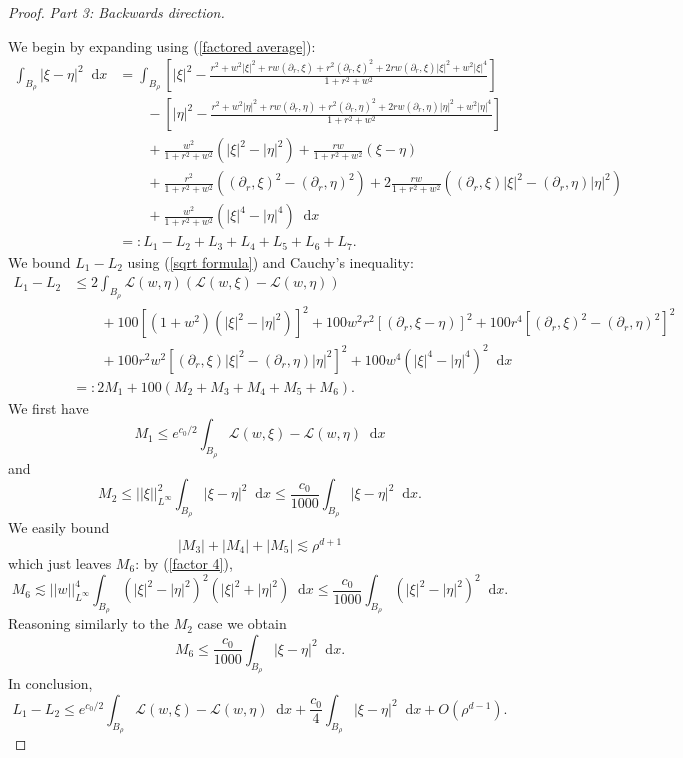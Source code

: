 \documentclass[reqno,10pt]{amsart}
\newcommand*\dif{\mathop{}\!\mathrm{d}}
\newcommand{\Lagrange}{\mathscr L}
\theoremstyle{definition}
\newcommand{\proofpart}[2]{%
  \par
  \addvspace{\medskipamount}%
  \noindent\emph{Part #1: #2.}
}
\numberwithin{equation}{section}
\begin{document}
\begin{proof}
\proofpart{3}{Backwards direction}
We begin by expanding using (\ref{factored average}):
\begin{align*}
\int_{B_\rho} |\xi - \eta|^2 \dif x &= \int_{B_\rho} \left[|\xi|^2 - \frac{r^2 + w^2 |\xi|^2 + rw (\partial_r, \xi) + r^2 (\partial_r, \xi)^2 + 2 rw (\partial_r, \xi) |\xi|^2 + w^2 |\xi|^4}{1 + r^2 + w^2}\right] \\
&\qquad - \left[|\eta|^2 - \frac{r^2 + w^2 |\eta|^2 + rw (\partial_r, \eta) + r^2 (\partial_r, \eta)^2 + 2 rw (\partial_r, \eta) |\eta|^2 + w^2 |\eta|^4}{1 + r^2 + w^2}\right] \\
&\qquad + \frac{w^2}{1 + r^2 + w^2} (|\xi|^2 - |\eta|^2) + \frac{rw}{1 + r^2 + w^2}(\xi - \eta) \\
&\qquad + \frac{r^2}{1 + r^2 + w^2} ((\partial_r, \xi)^2 - (\partial_r, \eta)^2) + 2\frac{rw}{1 + r^2 + w^2} ((\partial_r, \xi)|\xi|^2 - (\partial_r, \eta)|\eta|^2) \\
&\qquad + \frac{w^2}{1 + r^2 + w^2}(|\xi|^4 - |\eta|^4) \dif x \\
&=: L_1 - L_2 + L_3 + L_4 + L_5 + L_6 + L_7.
\end{align*}
We bound $L_1 - L_2$ using (\ref{sqrt formula}) and Cauchy's inequality:
\begin{align*}
L_1 - L_2
&\leq 2\int_{B_\rho} \Lagrange(w, \eta)(\Lagrange(w, \xi) - \Lagrange(w, \eta)) \\
&\qquad + 100[(1 + w^2)(|\xi|^2 - |\eta|^2)]^2 + 100w^2r^2[(\partial_r, \xi - \eta)]^2 + 100r^4[(\partial_r, \xi)^2 - (\partial_r, \eta)^2]^2 \\
&\qquad + 100r^2 w^2 [(\partial_r, \xi) |\xi|^2 - (\partial_r, \eta)|\eta|^2]^2 + 100w^4(|\xi|^4 - |\eta|^4)^2 \dif x\\
&=: 2M_1 + 100(M_2 + M_3 + M_4 + M_5 + M_6).
\end{align*}
We first have 
$$M_1 \leq e^{c_0/2} \int_{B_\rho} \Lagrange(w, \xi) - \Lagrange(w, \eta) \dif x$$
and
$$M_2 \leq ||\xi||_{L^\infty}^2 \int_{B_\rho} |\xi - \eta|^2 \dif x \leq \frac{c_0}{1000} \int_{B_\rho} |\xi - \eta|^2 \dif x.$$
We easily bound
$$|M_3| + |M_4| + |M_5| \lesssim \rho^{d + 1}$$
which just leaves $M_6$: by (\ref{factor 4}),
$$M_6 \lesssim ||w||_{L^\infty}^4 \int_{B_\rho} (|\xi|^2 - |\eta|^2)^2 (|\xi|^2 + |\eta|^2) \dif x \leq \frac{c_0}{1000} \int_{B_\rho} (|\xi|^2 - |\eta|^2)^2 \dif x.$$
Reasoning similarly to the $M_2$ case we obtain 
$$M_6 \leq \frac{c_0}{1000} \int_{B_\rho} |\xi - \eta|^2 \dif x.$$
In conclusion, 
\begin{equation}\label{L1 L2}
L_1 - L_2 \leq e^{c_0/2} \int_{B_\rho} \Lagrange(w, \xi) - \Lagrange(w, \eta) \dif x + \frac{c_0}{4} \int_{B_\rho} |\xi - \eta|^2 \dif x + O(\rho^{d - 1}).
\end{equation}


\end{proof}
\end{document}
